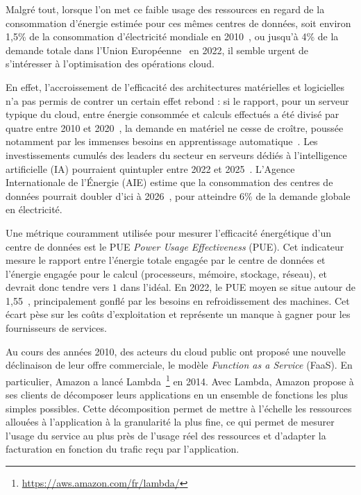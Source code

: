 Malgré tout, lorsque l'on met ce faible usage des ressources en regard de la consommation d'énergie estimée pour ces mêmes centres de données, soit environ 1,5\% de la consommation d'électricité mondiale en 2010~\cite{masanetRecalibratingGlobalData2020}, ou jusqu'à 4\% de la demande totale dans l'Union Européenne~\cite{Electricity2024Analysis2024} en 2022, il semble urgent de s'intéresser à l'optimisation des opérations cloud.

En effet, l'accroissement de l'efficacité des architectures matérielles et logicielles n'a pas permis de contrer un certain effet rebond : si le rapport, pour un serveur typique du cloud, entre énergie consommée et calculs effectués a été divisé par quatre entre 2010 et 2020~\cite{masanetRecalibratingGlobalData2020}, la demande en matériel ne cesse de croître, poussée notamment par les immenses besoins en apprentissage automatique~\cite{commentMetaOperate6002024}. Les investissements cumulés des leaders du secteur en serveurs dédiés à l'intelligence artificielle (IA) pourraient quintupler entre 2022 et 2025~\cite{DerriereIADeferlante2024, elderNextWaveAI2024}. L'Agence Internationale de l'Énergie (\gls{AIE}) estime que la consommation des centres de données pourrait doubler d'ici à 2026~\cite{Electricity2024Analysis2024}, pour atteindre 6\% de la demande globale en électricité.

Une métrique couramment utilisée pour mesurer l'efficacité énergétique d'un centre de données est le PUE \textit{Power Usage Effectiveness} (\gls{PUE}). Cet indicateur mesure le rapport entre l'énergie totale engagée par le centre de données et l'énergie engagée pour le calcul (processeurs, mémoire, stockage, réseau), et devrait donc tendre vers $1$ dans l'idéal. En 2022, le \gls{PUE} moyen se situe autour de 1,55~\cite{davisUptimeInstituteGlobal2022}, principalement gonflé par les besoins en refroidissement des machines. Cet écart pèse sur les coûts d'exploitation et représente un manque à gagner pour les fournisseurs de services.

Au cours des années 2010, des acteurs du cloud public ont proposé une nouvelle déclinaison de leur offre commerciale, le modèle \textit{Function as a Service} (FaaS). En particulier, Amazon a lancé Lambda~\footnote{\href{https://aws.amazon.com/fr/lambda/}{https://aws.amazon.com/fr/lambda/}} en 2014. Avec Lambda, Amazon propose à ses clients de décomposer leurs applications en un ensemble de fonctions les plus simples possibles. Cette décomposition permet de mettre à l'échelle les ressources allouées à l'application à la granularité la plus fine, ce qui permet de mesurer l'usage du service au plus près de l'usage réel des ressources et d'adapter la facturation en fonction du trafic reçu par l'application.

